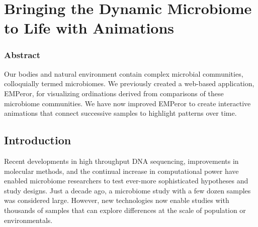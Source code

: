 \glsresetall

\section{Bringing the Dynamic Microbiome to Life with Animations}\label{section_animations}

\subsubsection{Abstract}

Our bodies and natural environment contain complex microbial communities, colloquially termed microbiomes. We previously created a web-based application, EMPeror, for visualizing ordinations derived from comparisons of these microbiome communities. We have now improved EMPeror to create interactive animations that connect successive samples to highlight patterns over time.

\subsection{Introduction}

Recent developments in high throughput DNA sequencing, improvements in molecular methods, and the continual increase in computational power have enabled microbiome researchers to test ever-more sophisticated hypotheses and study designs. Just a decade ago, a microbiome study with a few dozen samples was considered large. However, new technologies now enable studies with thousands of samples that can explore differences at the scale of population or environmentals.

